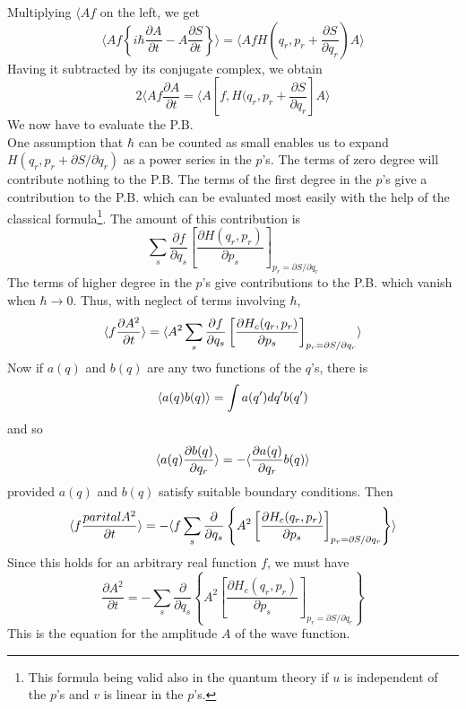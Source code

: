 Multiplying $\langle Af$ on the left, we get
\begin{equation}
\langle A f \left\{i\hbar\frac{\partial A}{\partial t}-A\frac{\partial S}{\partial t}\right\} \rangle = \langle A f  H\left(q_r,p_r +\frac{\partial S}{\partial q_r}\right) A\rangle
\end{equation}
Having it subtracted by its conjugate complex, we obtain
\begin{equation}
2\langle A f \frac{\partial A}{\partial t} = \langle A \left[f,H(q_r,p_r+\frac{\partial S}{\partial q_r}\right] A \rangle
\end{equation}
We now have to evaluate the P.B.
\begin{equation}
[f,H(q_r, p_r + \partial S/\partial q_r)]
\end{equation}
One assumption that $\hbar$ can be counted as small enables us to expand $H(q_r,p_r + \partial S / \partial q_r)$ as a power series in the $p$'s. The terms of zero degree will contribute nothing to the P.B. The terms of the first degree in the $p$'s give a contribution to the P.B. which can be evaluated most easily with the help of the classical formula\footnote{This formula being valid also in the quantum theory if $u$ is independent of the $p$'s and $v$ is linear in the $p$'s.}. The amount of this contribution is
\begin{equation}
\sum_s \frac{\partial f}{\partial q_s} \left[\frac{\partial H(q_r,p_r)}{\partial p_s}\right]_{p_r=\partial S/ \partial q_r}
\end{equation}
The terms of higher degree in the $p$'s give contributions to the P.B. which vanish when $\hbar \rightarrow 0$. Thus, with neglect of terms involving $\hbar$, 
\begin{equation}
\langle f\frac{\partial A^2}{\partial t} \rangle = \langle A^2 \sum_s \frac{\partial f}{\partial q_s} \left[\frac{\partial H_c(q_r,p_r)}{\partial p_s}\right]_{p_r=\partial S/\partial q_r} \rangle
\end{equation}
Now if $a(q)$ and $b(q)$ are any two functions of the $q$'s, there is
\begin{equation}
\langle a(q)b(q) \rangle=\int a(q')dq'b(q')
\end{equation}
and so
\begin{equation}
\langle a(q)\frac{\partial b(q)}{\partial q_r} \rangle=-\langle \frac{\partial a(q)}{\partial q_r}b(q) \rangle
\end{equation}
provided $a(q)$ and $b(q)$ satisfy suitable boundary conditions. Then
\begin{equation}
\langle f\frac{parital A^2}{\partial t} \rangle = -\langle f\sum_s \frac{\partial}{\partial q_s}\left\{A^2 \left[\frac{\partial H_c(q_r,p_r) }{\partial p_s}\right]_{p_r=\partial S/\partial q_r}\right\} \rangle
\end{equation}
Since this holds for an arbitrary real function $f$, we must have
\begin{equation}
\frac{\partial A^2}{\partial t} = - \sum_s \frac{\partial}{\partial q_s}\left\{A^2 \left[\frac{\partial H_c(q_r,p_r) }{\partial p_s}\right]_{p_r=\partial S/\partial q_r}\right\}
\end{equation}
This is the equation for the amplitude $A$ of the wave function.






